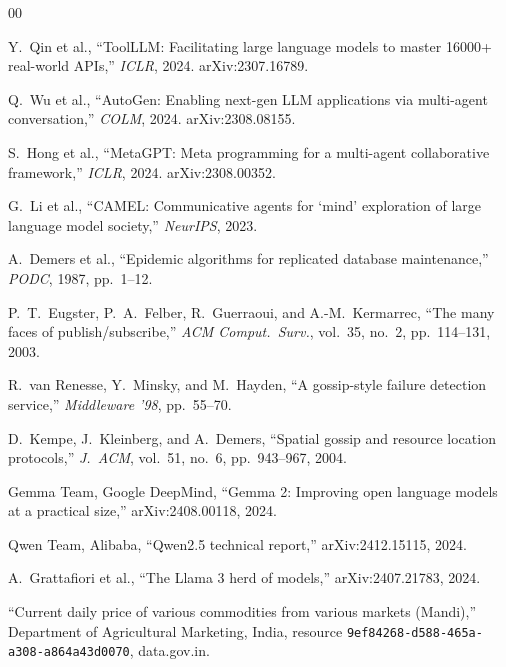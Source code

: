 \documentclass[conference]{IEEEtran}
\begin{document}
\begin{thebibliography}{00}

 Y.~Qin et al.,
``ToolLLM: Facilitating large language models to master 16000+ real-world APIs,''
\emph{ICLR}, 2024. arXiv:2307.16789.

 Q.~Wu et al.,
``AutoGen: Enabling next-gen LLM applications via multi-agent conversation,''
\emph{COLM}, 2024. arXiv:2308.08155.

 S.~Hong et al.,
``MetaGPT: Meta programming for a multi-agent collaborative framework,''
\emph{ICLR}, 2024. arXiv:2308.00352.

 G.~Li et al.,
``CAMEL: Communicative agents for `mind' exploration of large language model society,''
\emph{NeurIPS}, 2023.

 A.~Demers et al.,
``Epidemic algorithms for replicated database maintenance,''
\emph{PODC}, 1987, pp.\ 1--12.

 P.~T.~Eugster, P.~A.~Felber, R.~Guerraoui, and A.-M.~Kermarrec,
``The many faces of publish/subscribe,''
\emph{ACM Comput.\ Surv.}, vol.\ 35, no.\ 2, pp.\ 114--131, 2003.

 R.~van Renesse, Y.~Minsky, and M.~Hayden,
``A gossip-style failure detection service,''
\emph{Middleware '98}, pp.\ 55--70.

 D.~Kempe, J.~Kleinberg, and A.~Demers,
``Spatial gossip and resource location protocols,''
\emph{J.\ ACM}, vol.\ 51, no.\ 6, pp.\ 943--967, 2004.

 Gemma Team, Google DeepMind,
``Gemma 2: Improving open language models at a practical size,''
arXiv:2408.00118, 2024.

 Qwen Team, Alibaba,
``Qwen2.5 technical report,''
arXiv:2412.15115, 2024.

 A.~Grattafiori et al.,
``The Llama 3 herd of models,''
arXiv:2407.21783, 2024.

``Current daily price of various commodities from various markets (Mandi),''
Department of Agricultural Marketing, India, resource
\texttt{9ef84268-d588-465a-a308-a864a43d0070}, data.gov.in.

\end{thebibliography}
\end{document}

